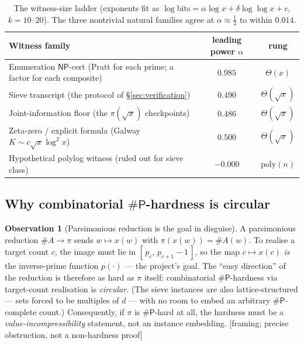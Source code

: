 \documentclass[11pt]{article}
\theoremstyle{plain}
\theoremstyle{definition}
\newtheorem{observation}[theorem]{Observation}
\theoremstyle{remark}
\newcommand{\stat}[1]{\quad\textnormal{\footnotesize\textsf{[\textcolor{accent}{#1}]}}}
\newcommand{\NP}{\mathsf{NP}}
\newcommand{\sharpP}{\#\mathsf{P}}
\begin{document}
\begin{table}[t]
\centering
\footnotesize
\begin{tabular}{@{}p{8.0cm} c c@{}}
\toprule
\textbf{Witness family} & \textbf{leading power $\alpha$} & \textbf{rung}\\
\midrule
Enumeration $\NP$-cert (Pratt for each prime; a factor for each composite) & $0.985$ & $\Theta(x)$ \\
Sieve transcript (the protocol of \S\ref{sec:verification}) & $0.490$ & $\Theta(\sqrt{x})$ \\
Joint-information floor (the $\pi(\sqrt{x})$ checkpoints) & $0.486$ & $\Theta(\sqrt{x})$ \\
Zeta-zero / explicit formula (Galway $K\sim c\sqrt{x}\log^2 x$) & $0.500$ & $\Theta(\sqrt{x})$ \\
Hypothetical polylog witness (ruled out for sieve class) & $-0.000$ & $\mathrm{poly}(n)$ \\
\bottomrule
\end{tabular}
\caption{The witness-size ladder (exponents fit as
$\log\text{bits}=\alpha\log x+\delta\log\log x+c$, $k=10$--$20$). The three
nontrivial natural families agree at $\alpha\approx\tfrac12$ to within $0.014$.}
\label{tab:ladder}
\end{table}

\subsection{Why combinatorial \texorpdfstring{$\sharpP$}{\#P}-hardness is circular}

\begin{observation}[Parsimonious reduction is the goal in disguise]
\label{obs:parsimonious}
A parsimonious reduction $\#A\to\pi$ sends $w\mapsto x(w)$ with $\pi(x(w))=\#A(w)$.
To realise a target count $c$, the image must lie in $[\,p_c,\,p_{c+1}-1\,]$, so
the map $c\mapsto x(c)$ \emph{is} the inverse-prime function $p(\cdot)$ --- the
project's goal. The ``easy direction'' of the reduction is therefore as hard as
$\pi$ itself: combinatorial $\sharpP$-hardness via target-count realisation is
\emph{circular}. (The sieve instances are also lattice-structured --- sets forced
to be multiples of $d$ --- with no room to embed an arbitrary $\sharpP$-complete
count.) Consequently, if $\pi$ is $\sharpP$-hard at all, the hardness must be a
\emph{value-incompressibility} statement, not an instance embedding.
\stat{framing; precise obstruction, not a non-hardness proof}
\end{observation}
\end{document}
